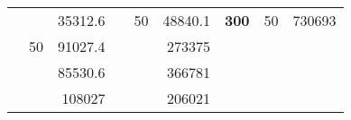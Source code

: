 \begin{table}[H]
\begin{tabular}{|ccrccrccc}
\rowcolor[HTML]{DDFDFF} 
\multicolumn{1}{|c|}{\cellcolor[HTML]{FFFFC7}}                                & \multicolumn{1}{c|}{\cellcolor[HTML]{DDFDFF}}                      & \multicolumn{1}{r|}{\cellcolor[HTML]{DAE8FC}35312.6}   & \multicolumn{1}{c|}{\cellcolor[HTML]{FFFFC7}}                                & \multicolumn{1}{c|}{\multirow{-10}{*}{\cellcolor[HTML]{DDFDFF}50}}  & \multicolumn{1}{r|}{\cellcolor[HTML]{DDFDFF}48840.1}   & \multicolumn{1}{c|}{\multirow{-19}{*}{\cellcolor[HTML]{FFFFC7}\textbf{300}}} & \multicolumn{1}{c|}{\multirow{-10}{*}{\cellcolor[HTML]{DDFDFF}50}} & \multicolumn{1}{r|}{\cellcolor[HTML]{DDFDFF}730693}    \\ \cline{3-3} \cline{5-9} 
\multicolumn{1}{|c|}{\cellcolor[HTML]{FFFFC7}}                                & \multicolumn{1}{c|}{\multirow{-10}{*}{\cellcolor[HTML]{DDFDFF}50}} & \multicolumn{1}{r|}{\cellcolor[HTML]{DDFDFF}91027.4}   & \multicolumn{1}{c|}{\cellcolor[HTML]{FFFFC7}}                                & \multicolumn{1}{c|}{\cellcolor[HTML]{DAE8FC}}                       & \multicolumn{1}{r|}{\cellcolor[HTML]{DAE8FC}273375}    &                                                                              &                                                                    &                                                        \\ \cline{2-3} \cline{6-6}
\multicolumn{1}{|c|}{\cellcolor[HTML]{FFFFC7}}                                & \multicolumn{1}{c|}{\cellcolor[HTML]{DAE8FC}}                      & \multicolumn{1}{r|}{\cellcolor[HTML]{DAE8FC}85530.6}   & \multicolumn{1}{c|}{\cellcolor[HTML]{FFFFC7}}                                & \multicolumn{1}{c|}{\cellcolor[HTML]{DAE8FC}}                       & \multicolumn{1}{r|}{\cellcolor[HTML]{DDFDFF}366781}    &                                                                              &                                                                    &                                                        \\ \cline{3-3} \cline{6-6}
\multicolumn{1}{|c|}{\cellcolor[HTML]{FFFFC7}}                                & \multicolumn{1}{c|}{\cellcolor[HTML]{DAE8FC}}                      & \multicolumn{1}{r|}{\cellcolor[HTML]{DDFDFF}108027}    & \multicolumn{1}{c|}{\cellcolor[HTML]{FFFFC7}}                                & \multicolumn{1}{c|}{\cellcolor[HTML]{DAE8FC}}                       & \multicolumn{1}{r|}{\cellcolor[HTML]{DAE8FC}206021}    &                                                                              &                                                                    &                                                        \\ \cline{3-3} \cline{6-6}

\end{tabular}
\end{table}
